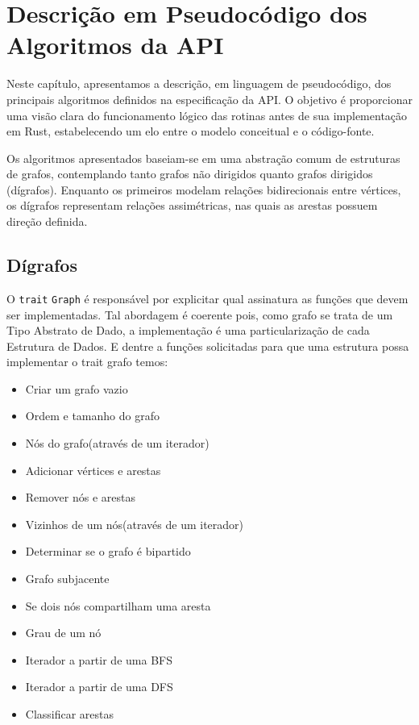 \chapter{Descrição em Pseudocódigo dos Algoritmos da API}
\label{ch:pseudocode}

Neste capítulo, apresentamos a descrição, em linguagem de
pseudocódigo, dos principais algoritmos definidos na especificação da
API. O objetivo é proporcionar uma visão clara do funcionamento
lógico das rotinas antes de sua implementação em Rust, estabelecendo
um elo entre o modelo conceitual e o código-fonte.

Os algoritmos apresentados baseiam-se em uma abstração comum de
estruturas de grafos, contemplando tanto grafos não dirigidos quanto
grafos dirigidos (dígrafos). Enquanto os primeiros modelam relações
bidirecionais entre vértices, os dígrafos representam relações
assimétricas, nas quais as arestas possuem direção definida.

\section{Dígrafos}
O \texttt{trait} \texttt{Graph} é responsável por explicitar qual
assinatura as funções que devem ser implementadas. Tal abordagem é
coerente pois, como grafo se trata de um Tipo Abstrato de Dado, a
implementação é uma particularização de cada Estrutura de Dados. E
dentre a funções solicitadas para que uma estrutura possa implementar
o trait grafo temos:

\begin{itemize}
  \item Criar um grafo vazio
  \item Ordem e tamanho do grafo
  \item Nós do grafo(através de um iterador)
  \item Adicionar vértices e arestas
  \item Remover nós e arestas
  \item Vizinhos de um nós(através de um iterador)
  \item Determinar se o grafo é bipartido
  \item Grafo subjacente
  \item Se dois nós compartilham uma aresta
  \item Grau de um nó
  \item Iterador a partir de uma BFS
  \item Iterador a partir de uma DFS
  \item Classificar arestas
\end{itemize}

